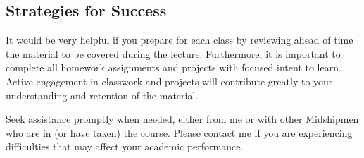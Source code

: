 \documentclass[letterpaper,hidelinks,oneside,11pt]{article}%
\begin{document}
\subsection*{Strategies for Success}

It would be very helpful if you prepare for each class by reviewing ahead of time the material to be covered during the lecture. Furthermore, it is important to complete all homework assignments and projects with focused intent to learn. Active engagement in classwork and projects will contribute greatly to your understanding and retention of the material.

Seek assistance promptly when needed, either from me or with other Midshipmen who are in (or have taken) the course. Please contact me if you are experiencing difficulties that may affect your academic performance.




\end{document}
